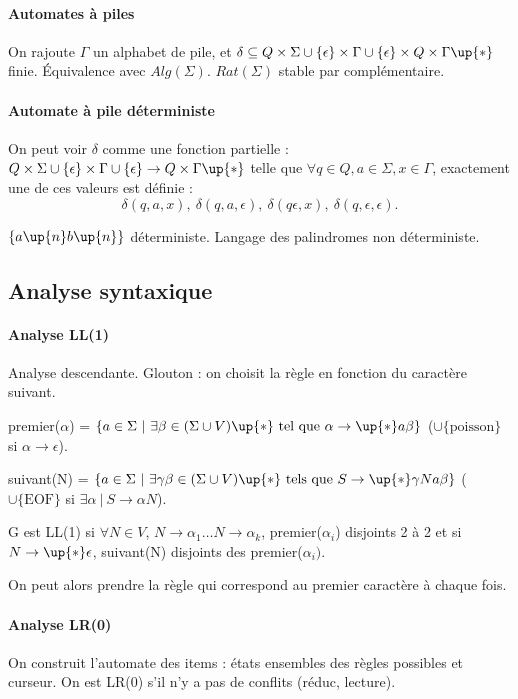 \documentclass[french]{article}
\begin{document}
\paragraph{Automates à piles}
On rajoute $\Gamma$ un alphabet de pile, et $\delta\subseteq Q\times\Sigma\cup\{\epsilon\}\times\Gamma\cup\{\epsilon\}\times Q\times\Gamma\up{*}$ finie. Équivalence avec $Alg(\Sigma)$. $Rat(\Sigma)$ stable par complémentaire.

\paragraph{Automate à pile déterministe}
On peut voir $\delta$ comme une fonction partielle : $Q\times\Sigma\cup\{\epsilon\}\times\Gamma\cup\{\epsilon\}\rightarrow Q\times\Gamma\up{*}$ telle que $\forall q\in Q, a\in\Sigma, x\in\Gamma$, exactement une de ces valeurs est définie : $$\delta(q,a,x),\ \delta(q,a,\epsilon),\ \delta(q\epsilon,x),\ \delta(q,\epsilon,\epsilon).$$

$\{a\up{n}b\up{n}\}$ déterministe. Langage des palindromes non déterministe.

\subsection{Analyse syntaxique}
\paragraph{Analyse LL(1)}
Analyse descendante. Glouton : on choisit la règle en fonction du caractère suivant. 

premier($\alpha$) = $\{a\in\Sigma~|~\exists\beta\in(\Sigma\cup V)\up{*}\text{ tel que }\alpha\rightarrow\up{*}a\beta\}$ ($\cup\{\text{poisson}\}$ si $\alpha\rightarrow\epsilon$).

suivant(N) = $\{a\in\Sigma~|~\exists\gamma\beta\in(\Sigma\cup V)\up{*}\text{ tels que }S\rightarrow\up{*}\gamma Na\beta\}$ ($\cup\{\text{EOF}\}$ si $\exists\alpha~|~S\rightarrow\alpha N$).

G est LL(1) si $\forall N\in V$, $N\rightarrow\alpha_1\dots N\rightarrow\alpha_k$, premier($\alpha_i$) disjoints 2 à 2 et si $N\rightarrow\up{*}\epsilon$, suivant(N) disjoints des premier($\alpha_i)$.

On peut alors prendre la règle qui correspond au premier caractère à chaque fois.


\paragraph{Analyse LR(0)}
On construit l'automate des items : états ensembles des règles possibles et curseur. On est LR(0) s'il n'y a pas de conflits (réduc, lecture).
\end{document}
